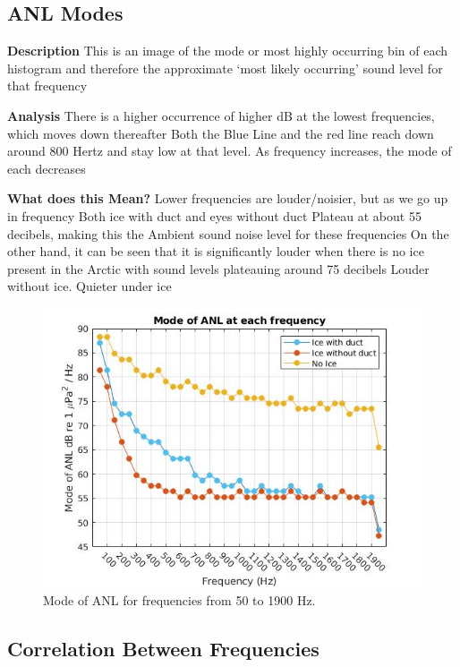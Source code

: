 \subsection{ANL Modes}
\textbf{Description}
This is an image of the mode or most highly occurring bin of each histogram and therefore the approximate ‘most likely occurring’ sound level for that frequency

\textbf{Analysis}
There is a higher occurrence of higher dB at the lowest frequencies, which moves down thereafter
 Both the Blue Line and the red line reach down around 800 Hertz and stay low at that level.
As frequency increases, the mode of each decreases

\textbf{What does this Mean?}
Lower frequencies are louder/noisier, but as we go up in frequency Both ice with duct and eyes without duct Plateau at about 55 decibels, making this the Ambient sound noise level for these frequencies
On the other hand, it can be seen that it is significantly louder when there is no ice present in the Arctic with sound levels plateauing around 75 decibels
Louder without ice. Quieter under ice

\begin{figure}[H]
\centering
\includegraphics[scale=0.5]{Figures/mode_ANL_allfreqs.jpg}
\caption{Mode of ANL for frequencies from 50 to 1900 Hz.}
\label{fig_mode}
\end{figure}





\subsection{Correlation Between Frequencies}

